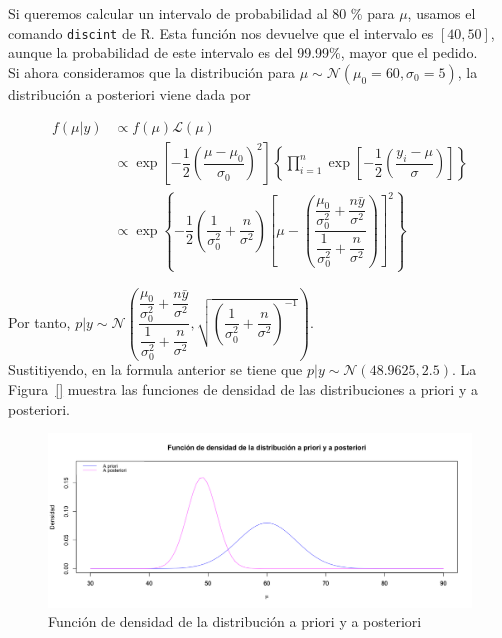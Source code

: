 \documentclass[12pt,a4paper,twoside,openright,titlepage,final]{article}
\begin{document}
Si queremos calcular un intervalo de probabilidad al 80 \% para $\mu$, usamos el comando \texttt{discint} de R. Esta función nos devuelve que el intervalo es $[40, 50]$, aunque la probabilidad de este intervalo es del 99.99\%, mayor que el pedido.\\

Si ahora consideramos que la distribución para $\mu \sim \mathcal{N}(\mu_0 = 60, \sigma_0 = 5)$, la distribución a posteriori viene dada por

\begin{align*}
f(\mu | y) & \propto f(\mu) \mathcal{L}(\mu) \\ & \propto \exp \left[ -\dfrac{1}{2} \left( \dfrac{\mu - \mu_0}{\sigma_0} \right)^2  \right] \left\{ \prod_{i=1}^{n} \exp \left[ -\dfrac{1}{2} \left( \dfrac{y_i - \mu}{\sigma} \right) \right] \right\} \\ 
& \propto \exp \left\{ -\dfrac{1}{2} \left( \dfrac{1}{\sigma_0^2} + \dfrac{n}{\sigma^2} \right) \left[ \mu - \left( \dfrac{\dfrac{\mu_0}{\sigma_0^2} + \dfrac{n \bar{y}}{\sigma^2}}{\dfrac{1}{\sigma_0^2} + \dfrac{n}{\sigma^2}} \right)\right]^2 \right\}
\end{align*}

Por tanto, $p|y \sim \mathcal{N}\left(\dfrac{\dfrac{\mu_0}{\sigma_0^2} + \dfrac{n \bar{y}}{\sigma^2}}{\dfrac{1}{\sigma_0^2} + \dfrac{n}{\sigma^2}}, \sqrt{\left( \dfrac{1}{\sigma_0^2} + \dfrac{n}{\sigma^2} \right)^{-1}}\right)$.\\

Sustitiyendo, en la formula anterior se tiene que $p|y \sim \mathcal{N}(48.9625, 2.5)$. La Figura~\ref{} muestra las funciones de densidad de las distribuciones a priori y a posteriori.\\

\begin{figure}[tbph!]
\centering
\includegraphics[width=0.9\linewidth]{./imagenes/distribucion_posteriori_normal_normal}
\caption{Función de densidad de la distribución a priori y a posteriori}
\label{fig:distribucion_posteriori_normal_normal}
\end{figure}
\end{document}
